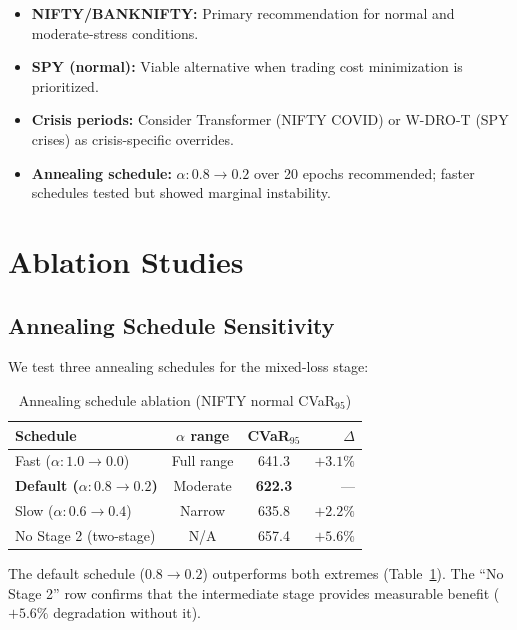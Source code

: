 \documentclass[11pt]{article}
\begin{document}
\begin{tcolorbox}[title=3SCH Deployment Guidance]
\begin{itemize}[noitemsep]
    \item \textbf{NIFTY/BANKNIFTY:} Primary recommendation for normal and moderate-stress conditions.
    \item \textbf{SPY (normal):} Viable alternative when trading cost minimization is prioritized.
    \item \textbf{Crisis periods:} Consider Transformer (NIFTY COVID) or W-DRO-T (SPY crises) as crisis-specific overrides.
    \item \textbf{Annealing schedule:} $\alpha: 0.8 \to 0.2$ over 20 epochs recommended; faster schedules tested but showed marginal instability.
\end{itemize}
\end{tcolorbox}

\section{Ablation Studies}
\label{sec:ablation}

\subsection{Annealing Schedule Sensitivity}

We test three annealing schedules for the mixed-loss stage:

\begin{table}[t]
\centering
\caption{Annealing schedule ablation (NIFTY normal CVaR$_{95}$)}
\label{tab:ablation_anneal}
\small
\begin{tabular}{lccr}
\toprule
\textbf{Schedule} & \textbf{$\alpha$ range} & \textbf{CVaR$_{95}$} & \textbf{$\Delta$} \\
\midrule
Fast ($\alpha: 1.0 \to 0.0$) & Full range & 641.3 & $+3.1\%$ \\
\textbf{Default ($\alpha: 0.8 \to 0.2$)} & Moderate & \textbf{622.3} & --- \\
Slow ($\alpha: 0.6 \to 0.4$) & Narrow & 635.8 & $+2.2\%$ \\
No Stage 2 (two-stage) & N/A & 657.4 & $+5.6\%$ \\
\bottomrule
\end{tabular}
\end{table}

The default schedule ($0.8 \to 0.2$) outperforms both extremes (Table~\ref{tab:ablation_anneal}). The ``No Stage 2'' row confirms that the intermediate stage provides measurable benefit ($+5.6\%$ degradation without it).
\end{document}
